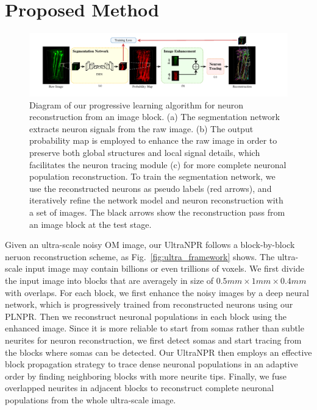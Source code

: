 \section{Proposed Method}
\label{sec:method}
\begin{figure}[th]
	\centering
	\includegraphics[width=1\textwidth]{./Illustrations/framework_plnpr.pdf}
	\caption{Diagram of our progressive learning algorithm for neuron reconstruction from an image block. (a) The segmentation network extracts neuron signals from the raw image. (b) The output probability map is employed to enhance the raw image in order to preserve both global structures and local signal details, which facilitates the neuron tracing module (c) for more complete neuronal population reconstruction. To train the segmentation network, we use the reconstructed neurons as pseudo labels (red arrows), and iteratively refine the network model and neuron reconstruction with a set of images. The black arrows show the reconstruction pass from an image block at the test stage.}
	\label{fig:framework}
\end{figure}


Given an ultra-scale noisy OM image, our UltraNPR follows a block-by-block neruon reconstruction scheme, as Fig.~\ref{fig:ultra_framework} shows. 
%
The ultra-scale input image may contain billions or even trillions of voxels.
We first divide the input image into blocks that are averagely in size of $0.5mm\times 1mm\times 0.4mm$ with overlaps. 
%
For each block, we first enhance the noisy images by a deep neural network, which is progressively trained from reconstructed neurons using our PLNPR. 
Then we reconstruct neuronal populations in each block using the enhanced image. 
%
Since it is more reliable to start from somas rather than subtle neurites for neuron reconstruction, we first detect somas and start tracing from the blocks where somas can be detected. 
%
Our UltraNPR then employs an effective block propagation strategy to trace dense neuronal populations in an adaptive order by finding neighboring blocks with more neurite tips. 
Finally, we fuse overlapped neurites in adjacent blocks to reconstruct complete neuronal populations from the whole ultra-scale image.


